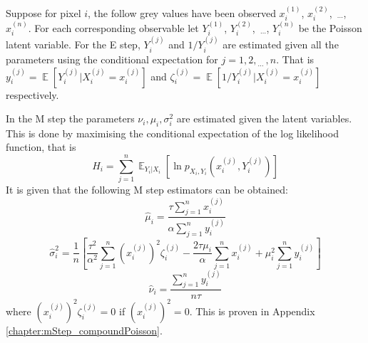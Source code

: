 \documentclass[12pt]{report}
\DeclareMathOperator{\expectation}{\mathbb{E}}
\newcommand{\dotdotdot}{_{\phantom{.}\cdots}}
\begin{document}
Suppose for pixel $i$, the follow grey values have been observed $x_i^{(1)}$, $x_i^{(2)}$, $\dotdotdot$, $x_i^{(n)}$. For each corresponding observable let $Y_i^{(1)}$, $Y_i^{(2)}$, $\dotdotdot$, $Y_i^{(n)}$ be the Poisson latent variable. For the E step, $Y_i^{(j)}$ and $1/Y_i^{(j)}$ are estimated given all the parameters using the conditional expectation for $j=1,2,\dotdotdot,n$. That is $y_i^{(j)}=\expectation\left[Y_i^{(j)}|X_i^{(j)}=x_i^{(j)}\right]$ and $\zeta_i^{(j)}=\expectation\left[1/Y_i^{(j)}|X_i^{(j)}=x_i^{(j)}\right]$ respectively. 

In the M step the parameters $\nu_i,\mu_i,\sigma_i^2$ are estimated given the latent variables. This is done by maximising the conditional expectation of the log likelihood function, that is
\begin{equation}
H_i=\sum_{j=1}^n\expectation_{Y_i|X_i}\left[\ln p_{X_i,Y_i}\left(x_i^{(j)},Y_i^{(j)}\right)\right]
\end{equation}
It is given that the following M step estimators can be obtained:
\begin{equation}
\widehat{\mu}_i=\frac{\tau\sum_{j=1}^nx_i^{(j)}}{\alpha\sum_{j=1}^ny_i^{(j)}}
\end{equation}
\begin{equation}
\widehat{\sigma}_i^2=\frac{1}{n}\left[
\frac{\tau^2}{\alpha^2}\sum_{j=1}^n\left(x_i^{(j)}\right)^2\zeta_i^{(j)}
-\frac{2\tau\mu_i}{\alpha}\sum_{j=1}^nx_i^{(j)}
+\mu_i^2\sum_{j=1}^ny_i^{(j)}
\right]
\end{equation}
\begin{equation}
\widehat{\nu}_i=\frac{\sum_{j=1}^ny_i^{(j)}}{n\tau}
\end{equation}
where $\left(x_i^{(j)}\right)^2\zeta_i^{(j)}=0$ if $\left(x_i^{(j)}\right)^2=0$. This is proven in Appendix \ref{chapter:mStep_compoundPoisson}.
\end{document}
